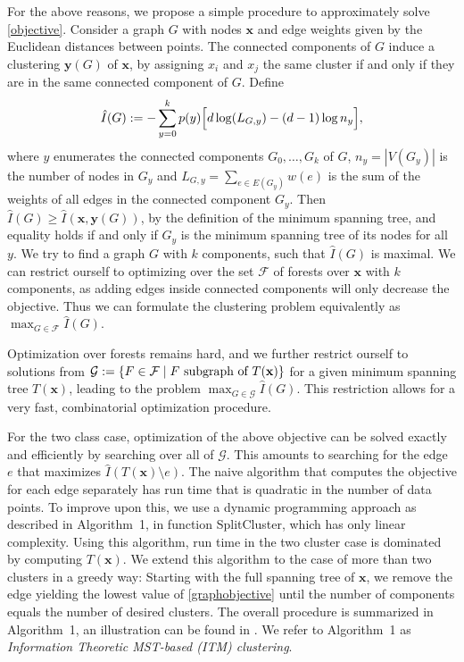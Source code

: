 For the above reasons, we propose a simple procedure to approximately solve
\eqref{objective}.
Consider a graph $G$ with nodes $\mathbf{x}$ and edge weights given by the
Euclidean distances between points.  The connected components of $G$ induce a
clustering $\mathbf{y}(G)$ of $\mathbf{x}$, by assigning $x_i$ and $x_j$ the
same cluster if and only if they are in the same connected component of $G$.
Define
\setlength{\abovedisplayskip}{1mm}
\setlength{\belowdisplayskip}{1mm}
\begin{align}\label{graphobjective}
\hat{I}(G) := - \sum_{y=0}^k p(y) \Bigl[ d \log(L_{G,y}) - (d-1) \log{n_y} \Bigr],
\end{align}
where $y$ enumerates the connected components $G_0, \dotsc, G_k$ of $G$, $n_y =
|V(G_y)|$ is the number of nodes in $G_y$ and $L_{G,y} = \sum_{e \in E(G_y)}
w(e)$ is the sum of the weights of all edges in the connected component $G_y$.
%
Then $\hat{I}(G) \geq \hat{I}(\mathbf{x}, \mathbf{y}(G))$, by the definition of
the minimum spanning tree, and equality holds if and only if $G_y$ is the
minimum spanning tree of its nodes for all $y$.
%
We try to find a graph $G$ with $k$ components, such that $\hat{I}(G)$ is maximal. We can restrict
ourself to optimizing over the set $\mathcal{F}$ of forests over $\mathbf{x}$ with $k$ components,
as adding edges inside connected components will only decrease the objective.
Thus we can formulate the clustering problem equivalently as
$\displaystyle \max_{G \in \mathcal{F}} \hat{I}(G)$.


Optimization over forests remains hard, and we further restrict ourself to
solutions from $\mathcal{G} := \{ F \in \mathcal{F} \mid F \text{\ subgraph of\
} T(\mathbf{x}) \}$ for a given minimum spanning tree $T(\mathbf{x})$, leading to
the problem $\max_{G \in \mathcal{G}} \hat{I}(G)$.  This restriction allows for
a very fast, combinatorial optimization procedure.


For the two class case, optimization of the above objective can be solved
exactly and efficiently by searching over all of $\mathcal{G}$.
This amounts to searching for the edge $e$ that maximizes $\hat{I}(T(\mathbf{x})
\setminus e)$. The naive algorithm that computes the objective for each edge
separately has run time that is quadratic in the number of data points.  To
improve upon this, we use a dynamic programming approach as described in
Algorithm~1, in function SplitCluster, which has only linear
complexity. Using this algorithm, run time in the two cluster case is dominated
by computing $T(\mathbf{x})$.
%
We extend this algorithm to the case of more than two clusters in a greedy way:
Starting with the full spanning tree of $\mathbf{x}$, we remove the edge
yielding the lowest value of \eqref{graphobjective} until the number of
components equals the number of desired clusters. The overall procedure is
summarized in Algorithm~1, an illustration can be found in
. We refer to Algorithm~1 as \emph{Information
Theoretic MST-based (ITM) clustering}.

